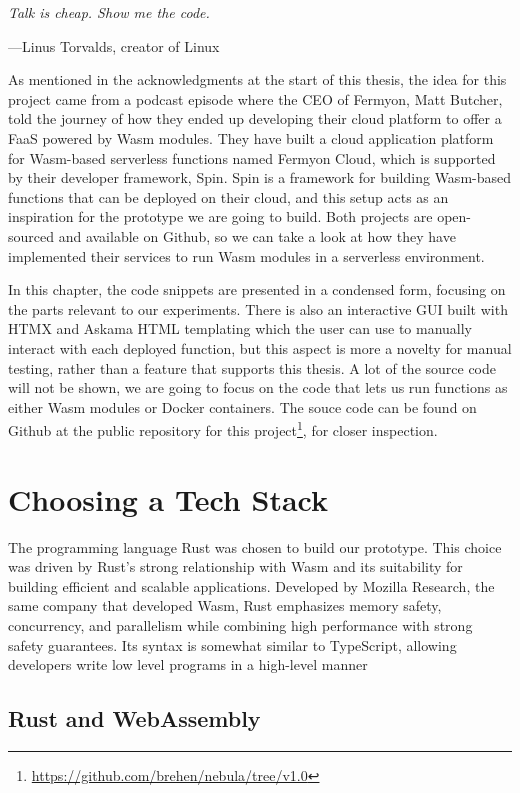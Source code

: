 \documentclass[
  table]{report}
\begin{document}
\epigraph{\itshape  
Talk is cheap. Show me the code.
}{---Linus Torvalds, creator of Linux}

As mentioned in the acknowledgments at the start of this thesis, the
idea for this project came from a podcast episode where the CEO of
Fermyon, Matt Butcher, told the journey of how they ended up developing
their cloud platform to offer a \ac{FaaS} powered by \ac{Wasm} modules.
They have built a cloud application platform for \ac{Wasm}-based
serverless functions named Fermyon Cloud, which is supported by their
developer framework, Spin. Spin is a framework for building
\ac{Wasm}-based functions that can be deployed on their cloud, and this
setup acts as an inspiration for the prototype we are going to build.
Both projects are open-sourced and available on Github, so we can take a
look at how they have implemented their services to run \ac{Wasm}
modules in a serverless environment.

In this chapter, the code snippets are presented in a condensed form,
focusing on the parts relevant to our experiments. There is also an
interactive GUI built with HTMX and Askama HTML templating which the
user can use to manually interact with each deployed function, but this
aspect is more a novelty for manual testing, rather than a feature that
supports this thesis. A lot of the source code will not be shown, we are
going to focus on the code that lets us run functions as either
\ac{Wasm} modules or Docker containers. The souce code can be found on
Github at the public repository for this project\footnote{\url{https://github.com/brehen/nebula/tree/v1.0}},
for closer inspection.

\section{Choosing a Tech Stack}
\label{sect:tech_stack}

The programming language Rust was chosen to build our prototype. This
choice was driven by Rust's strong relationship with \ac{Wasm} and its
suitability for building efficient and scalable applications. Developed
by Mozilla Research, the same company that developed \ac{Wasm}, Rust
emphasizes memory safety, concurrency, and parallelism while combining
high performance with strong safety guarantees. Its syntax is somewhat
similar to TypeScript, allowing developers write low level programs in a
high-level manner

\subsection{Rust and WebAssembly}
\label{sect:rust_and_wasm}
\end{document}
